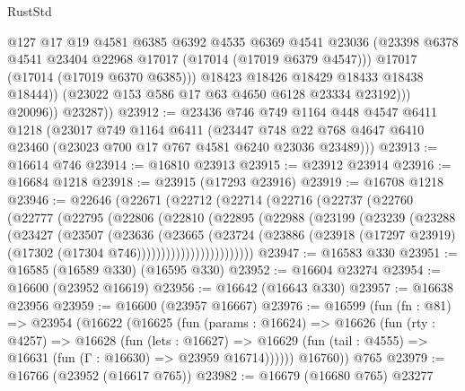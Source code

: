 \begin{lexlean}{RustStd}
\begin{coremodule}
                      @127
                      @17
                      @19
                      @4581
                      @6385
                      @6392
                      @4535
                      @6369
                      @4541
                      @23036
                      (@23398 @6378 @4541 @23404 @22968 @17017 (@17014 (@17019 @6379 @4547)))
                      @17017
                      (@17014 (@17019 @6370 @6385)))
                    @18423
                    @18426
                    @18429
                    @18433
                    @18438
                    @18444))
                (@23022 @153 @586 @17 @63 @4650 @6128 @23334 @23192)))
            @20096))
        @23287))
@23912 := @23436
    @746
    @749
    @1164
    @448
    @4547
    @6411
    @1218
    (@23017
      @749
      @1164
      @6411
      (@23447 @748 @22 @768 @4647 @6410 @23460 (@23023 @700 @17 @767 @4581 @6240 @23036 @23489)))
@23913 := @16614 @746
@23914 := @16810 @23913
@23915 := @23912 @23914
@23916 := @16684 @1218
@23918 := @23915 (@17293 @23916)
@23919 := @16708 @1218
@23946 := @22646
    (@22671
      (@22712
        (@22714
          (@22716
            (@22737
              (@22760
                (@22777
                  (@22795
                    (@22806
                      (@22810
                        (@22895
                          (@22988
                            (@23199
                              (@23239
                                (@23288
                                  (@23427
                                    (@23507
                                      (@23636
                                        (@23665
                                          (@23724
                                            (@23886
                                              (@23918
                                                (@17297 @23919)
                                                (@17302 (@17304 @746))))))))))))))))))))))))
@23947 := @16583 @330
@23951 := @16585 (@16589 @330) (@16595 @330)
@23952 := @16604 @23274
@23954 := @16600 (@23952 @16619)
@23956 := @16642 (@16643 @330)
@23957 := @16638 @23956
@23959 := @16600 (@23957 @16667)
@23976 := @16599
    (fun (fn : @81) =>
    @23954
      (@16622
        (@16625
          (fun (params : @16624) =>
          @16626
            (fun (rty : @4257) =>
            @16628
              (fun (lets : @16627) =>
              @16629 (fun (tail : @4555) => @16631 (fun (Γ : @16630) => @23959 @16714))))))
        @16760))
    @765
@23979 := @16766 (@23952 (@16617 @765))
@23982 := @16679 (@16680 @765) @23277

\end{coremodule}
\end{lexlean}
